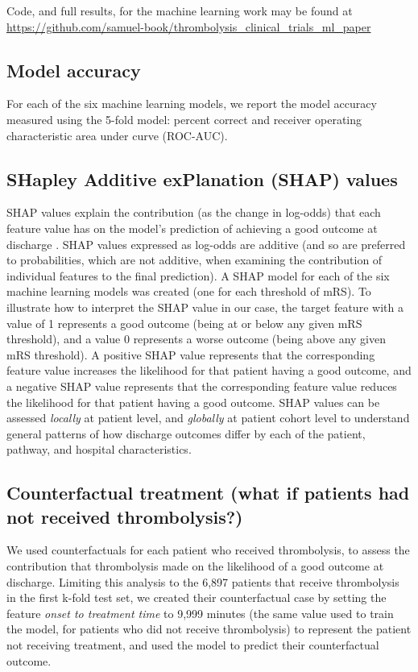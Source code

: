 Code, and full results, for the machine learning work may be found at \url{https://github.com/samuel-book/thrombolysis_clinical_trials_ml_paper}

\subsection{Model accuracy}

For each of the six machine learning models, we report the model accuracy measured using the 5-fold model: percent correct and receiver operating characteristic area under curve (ROC-AUC).

\subsection{SHapley Additive exPlanation (SHAP) values}

SHAP values explain the contribution (as the change in log-odds) that each feature value has on the model’s prediction of achieving a good outcome at discharge \cite{lundberg_unified_2017}. SHAP values expressed as log-odds are additive (and so are preferred to probabilities, which are not additive, when examining the contribution of individual features to the final prediction). A SHAP model for each of the six machine learning models was created (one for each threshold of mRS). To illustrate how to interpret the SHAP value in our case, the target feature with a value of 1 represents a good outcome (being at or below any given mRS threshold), and a value 0 represents a worse outcome (being above any given mRS threshold). A positive SHAP value represents that the corresponding feature value increases the likelihood for that patient having a good outcome, and a negative SHAP value represents that the corresponding feature value reduces the likelihood for that patient having a good outcome. SHAP values can be assessed \textit{locally} at patient level, and \textit{globally} at patient cohort level to understand general patterns of how discharge outcomes differ by each of the patient, pathway, and hospital characteristics.

\subsection{Counterfactual treatment (what if patients had not received thrombolysis?)}

We used counterfactuals for each patient who received thrombolysis, to assess the contribution that thrombolysis made on the likelihood of a good outcome at discharge. Limiting this analysis to the 6,897 patients that receive thrombolysis in the first k-fold test set, we created their counterfactual case by setting the feature \textit{onset to treatment time} to 9,999 minutes (the same value used to train the model, for patients who did not receive thrombolysis) to represent the patient not receiving treatment, and used the model to predict their counterfactual outcome.


